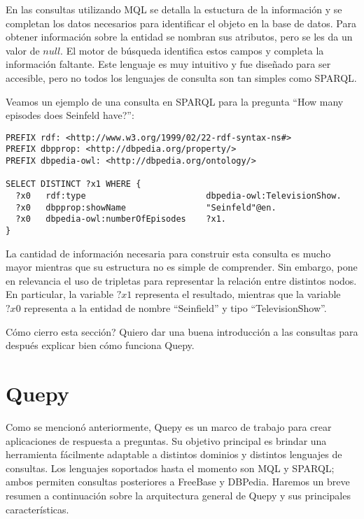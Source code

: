 En las consultas utilizando MQL se detalla la estuctura de la información y se completan los datos necesarios para identificar el objeto en la base de datos. Para obtener información sobre la entidad se nombran sus atributos, pero se les da un valor de $null$. El motor de búsqueda identifica estos campos y completa la información faltante. Este lenguaje es muy intuitivo y fue diseñado para ser accesible, pero no todos los lenguajes de consulta son tan simples como SPARQL.

Veamos un ejemplo de una consulta en SPARQL para la pregunta ``How many episodes does Seinfeld have?'':

\vspace{5mm}

\begin{lstlisting}
PREFIX rdf: <http://www.w3.org/1999/02/22-rdf-syntax-ns#>
PREFIX dbpprop: <http://dbpedia.org/property/>
PREFIX dbpedia-owl: <http://dbpedia.org/ontology/>

SELECT DISTINCT ?x1 WHERE {
  ?x0   rdf:type                        dbpedia-owl:TelevisionShow.
  ?x0   dbpprop:showName                "Seinfeld"@en.
  ?x0   dbpedia-owl:numberOfEpisodes    ?x1.
}
\end{lstlisting}

La cantidad de información necesaria para construir esta consulta es mucho mayor mientras que su estructura no es simple de comprender. Sin embargo, pone en relevancia el uso de tripletas para representar la relación entre distintos nodos. En particular, la variable $?x1$ representa el resultado, mientras que la variable $?x0$ representa a la entidad de nombre ``Seinfield'' y tipo ``TelevisionShow''.

Cómo cierro esta sección? Quiero dar una buena introducción a las consultas para después explicar bien cómo funciona Quepy.


\section{Quepy}

Como se mencionó anteriormente, Quepy es un marco de trabajo para crear aplicaciones de respuesta a preguntas. Su objetivo principal es brindar una herramienta fácilmente adaptable a distintos dominios y distintos lenguajes de consultas. Los lenguajes soportados hasta el momento son MQL y SPARQL; ambos permiten consultas posteriores a FreeBase y DBPedia. Haremos un breve resumen a continuación sobre la arquitectura general de Quepy y sus principales características.

